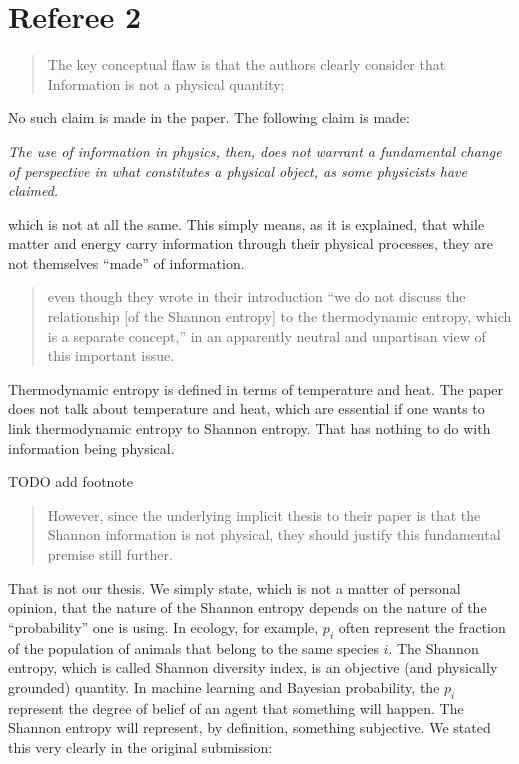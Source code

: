 \documentclass[11pt]{article}
\begin{document}
\section*{Referee 2}

\begin{quote}
	The key conceptual flaw is that the authors clearly consider that Information is not a physical quantity;
\end{quote}

No such claim is made in the paper. The following claim is made:

\emph{The use of information in physics, then, does not warrant a fundamental change of perspective in what constitutes a physical object, as some physicists have claimed.}

\noindent which is not at all the same. This simply means, as it is explained, that while matter and energy carry information through their physical processes, they are not themselves ``made'' of information.

\begin{quote}
	even though they wrote in their introduction “we do not discuss the relationship [of the Shannon entropy] to the thermodynamic entropy, which is a separate concept,” in an apparently neutral and unpartisan view of this important issue.
\end{quote}
Thermodynamic entropy is defined in terms of temperature and heat. The paper does not talk about temperature and heat, which are essential if one wants to link thermodynamic entropy to Shannon entropy. That has nothing to do with information being physical.

TODO add footnote

\begin{quote}
However, since the underlying implicit thesis to their paper is that the Shannon information is not physical, they should justify this fundamental premise still further.
\end{quote}
That is not our thesis. We simply state, which is not a matter of personal opinion, that the nature of the Shannon entropy depends on the nature of the ``probability'' one is using. In ecology, for example, $p_i$ often represent the fraction of the population of animals that belong to the same species $i$. The Shannon entropy, which is called Shannon diversity index, is an objective (and physically grounded) quantity. In machine learning and Bayesian probability, the $p_i$ represent the degree of belief of an agent that something will happen. The Shannon entropy will represent, by definition, something subjective. We stated this very clearly in the original submission:
\end{document}
